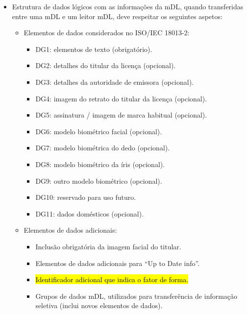 \begin{itemize}
	\item Estrutura de dados lógicos com as informações da mDL, quando transferidas entre uma mDL e um leitor mDL, deve respeitar os seguintes aspetos:
	\begin{itemize}
		\item Elementos de dados considerados no ISO/IEC 18013-2:
		\begin{itemize}
			\item DG1: elementos de texto (obrigatório).
			\item DG2: detalhes do titular da licença (opcional).
			\item DG3: detalhes da autoridade de emissora (opcional).
			\item DG4: imagem do retrato do titular da licença (opcional).
			\item DG5: assinatura / imagem de marca habitual (opcional).
			\item DG6: modelo biométrico facial (opcional).
			\item DG7: modelo biométrica do dedo (opcional).
			\item DG8: modelo biométrico da íris (opcional).
			\item DG9: outro modelo biométrico (opcional).
			\item DG10: reservado para uso futuro.
			\item DG11: dados domésticos (opcional).
		\end{itemize}

		\item Elementos de dados adicionais:
		\begin{itemize}
			\item Inclusão obrigatória da imagem facial do titular.
			\item Elementos de dados adicionais para ``Up to Date info''.
			\item \hl{Identificador adicional que indica o fator de forma.}
			\item Grupos de dados mDL, utilizados para transferência de informação seletiva (inclui novos elementos de dados).
		\end{itemize}
	\end{itemize}


\end{itemize}
